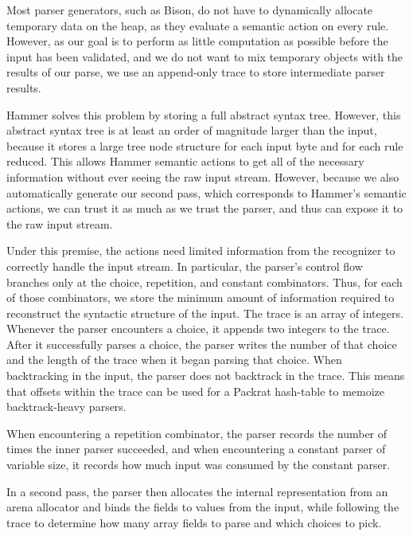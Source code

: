 Most parser generators, such as Bison, do not have to dynamically allocate temporary data on the
heap, as they evaluate a semantic action on every rule. However, as our goal is to perform as little
computation as possible before the input has been validated, and we do not want to mix temporary
objects with the results of our parse, we use an append-only trace to store intermediate parser
results.

Hammer solves this problem by storing a full abstract syntax tree. However, this
abstract syntax tree is at least an order of magnitude larger than the input,
because it stores a large tree node structure for each input byte and for each
rule reduced. This allows Hammer semantic actions to get all of the necessary
information without ever seeing the raw input stream. However, because we also
automatically generate our second pass, which corresponds to Hammer's semantic
actions, we can trust it as much as we trust the parser, and thus can expose it
to the raw input stream.

Under this premise, the actions need limited information from the
recognizer to correctly handle the input stream. In particular, the parser's
control flow branches only at the choice, repetition, and constant combinators.
Thus, for each of those combinators, we store the minimum amount of information
required to reconstruct the syntactic structure of the input. The trace is an
array of integers.
Whenever the parser encounters a choice, it appends two integers to the trace. After it
successfully parses a choice, the parser writes the number of that choice and
the length of the trace when it began parsing that choice. When backtracking in
the input, the parser does not backtrack in the trace. This means that offsets
within the trace can be used for a Packrat hash-table to memoize backtrack-heavy
parsers.

When encountering a repetition combinator, the parser records the number of
times the inner parser succeeded, and when encountering a constant parser of
variable size, it records how much input was consumed by the constant parser. 

In a second pass, the parser then allocates the internal representation from an
arena allocator and binds the fields to values from the input, while following
the trace to determine how many array fields to parse and which choices to pick.


